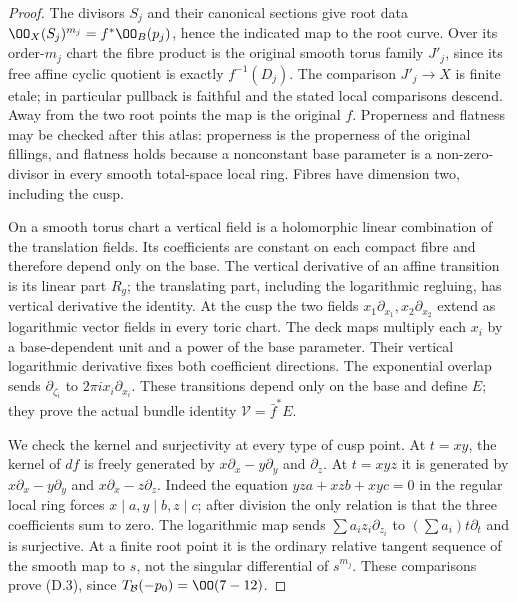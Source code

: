 \begin{proof}
The divisors $S_j$ and their canonical sections give root data
$\OO_X(S_j)^{m_j}=f^*\OO_B(p_j)$, hence the indicated map to the root
curve. Over its order-$m_j$ chart the fibre product is the original
smooth torus family $J'_j$, since its free affine cyclic quotient is
exactly $f^{-1}(D_j)$. The comparison $J'_j\to X$ is finite etale;
in particular pullback is faithful and the stated local comparisons
descend. Away from the two root points the map is the original $f$.
Properness and flatness may be checked after this atlas: properness is
the properness of the original fillings, and flatness holds because a
nonconstant base parameter is a non-zero-divisor in every smooth
total-space local ring. Fibres have dimension two, including the cusp.

On a smooth torus chart a vertical field is a holomorphic linear
combination of the translation fields. Its coefficients are constant
on each compact fibre and therefore depend only on the base. The
vertical derivative of an affine transition is its linear part $R_g$;
the translating part, including the logarithmic regluing, has vertical
derivative the identity. At the cusp the two fields
$x_1\partial_{x_1},x_2\partial_{x_2}$ extend as logarithmic vector
fields in every toric chart. The deck maps multiply each $x_i$ by a
base-dependent unit and a power of the base parameter. Their vertical
logarithmic derivative fixes both coefficient directions. The
exponential overlap sends $\partial_{\zeta_i}$ to
$2\pi i x_i\partial_{x_i}$. These transitions depend only on the base
and define $E$; they prove the actual bundle identity
$\mathcal V=\bar f^*E$.

We check the kernel and surjectivity at every type of cusp point. At
$t=xy$, the kernel of $df$ is freely generated by
$x\partial_x-y\partial_y$ and $\partial_z$. At $t=xyz$ it is generated
by $x\partial_x-y\partial_y$ and $x\partial_x-z\partial_z$.
Indeed the equation $yz a+xz b+xy c=0$ in the regular local ring forces
$x\mid a,y\mid b,z\mid c$; after division the only relation is that
the three coefficients sum to zero. The logarithmic map sends
$\sum a_i z_i\partial_{z_i}$ to $(\sum a_i)t\partial_t$ and is
surjective. At a finite root point it is the ordinary relative tangent
sequence of the smooth map to $s$, not the singular differential of
$s^{m_j}$. These comparisons prove (D.3), since
$T_{\mathcal B}(-p_0)=\OO(7-12)$.


\end{proof}
